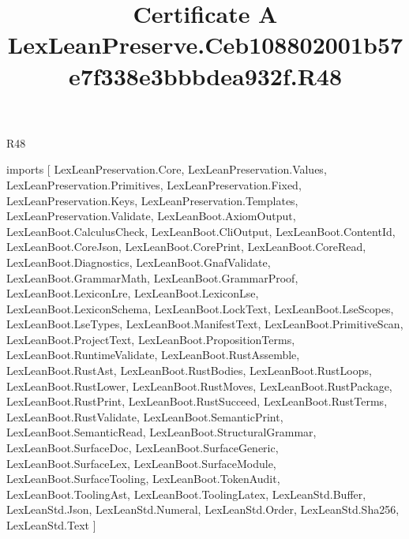 \begin{lexlean}{R48}
\title{Certificate A LexLeanPreserve.Ceb108802001b57e7f338e3bbbdea932f.R48}
\begin{coremodule}
imports [
  LexLeanPreservation.Core,
  LexLeanPreservation.Values,
  LexLeanPreservation.Primitives,
  LexLeanPreservation.Fixed,
  LexLeanPreservation.Keys,
  LexLeanPreservation.Templates,
  LexLeanPreservation.Validate,
  LexLeanBoot.AxiomOutput,
  LexLeanBoot.CalculusCheck,
  LexLeanBoot.CliOutput,
  LexLeanBoot.ContentId,
  LexLeanBoot.CoreJson,
  LexLeanBoot.CorePrint,
  LexLeanBoot.CoreRead,
  LexLeanBoot.Diagnostics,
  LexLeanBoot.GnafValidate,
  LexLeanBoot.GrammarMath,
  LexLeanBoot.GrammarProof,
  LexLeanBoot.LexiconLre,
  LexLeanBoot.LexiconLse,
  LexLeanBoot.LexiconSchema,
  LexLeanBoot.LockText,
  LexLeanBoot.LseScopes,
  LexLeanBoot.LseTypes,
  LexLeanBoot.ManifestText,
  LexLeanBoot.PrimitiveScan,
  LexLeanBoot.ProjectText,
  LexLeanBoot.PropositionTerms,
  LexLeanBoot.RuntimeValidate,
  LexLeanBoot.RustAssemble,
  LexLeanBoot.RustAst,
  LexLeanBoot.RustBodies,
  LexLeanBoot.RustLoops,
  LexLeanBoot.RustLower,
  LexLeanBoot.RustMoves,
  LexLeanBoot.RustPackage,
  LexLeanBoot.RustPrint,
  LexLeanBoot.RustSucceed,
  LexLeanBoot.RustTerms,
  LexLeanBoot.RustValidate,
  LexLeanBoot.SemanticPrint,
  LexLeanBoot.SemanticRead,
  LexLeanBoot.StructuralGrammar,
  LexLeanBoot.SurfaceDoc,
  LexLeanBoot.SurfaceGeneric,
  LexLeanBoot.SurfaceLex,
  LexLeanBoot.SurfaceModule,
  LexLeanBoot.SurfaceTooling,
  LexLeanBoot.TokenAudit,
  LexLeanBoot.ToolingAst,
  LexLeanBoot.ToolingLatex,
  LexLeanStd.Buffer,
  LexLeanStd.Json,
  LexLeanStd.Numeral,
  LexLeanStd.Order,
  LexLeanStd.Sha256,
  LexLeanStd.Text
]


\end{coremodule}
\end{lexlean}
